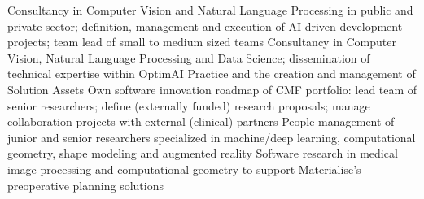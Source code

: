 \documentclass[
	a4paper,
	sidesectionsize=Large,
	maincolor=cvprimary,
	sectioncolor=cvprimary,
	sidecolor=cvprimary!10,
	topbottommargin=0.02\paperheight,
	leftrightmargin=0.02\paperwidth,
	profilepiczoom=1.6,
	profilepicxshift=-1mm,
	profilepicyshift=-7mm,
	profilepicrounding=0.5cm,
]{fortysecondscv}
\begin{document}
\makefrontsidebar
\newlength{\firstpagespacing}
\setlength{\firstpagespacing}{2ex}

\vspace{\firstpagespacing}
\vspace*{-1ex}
\begin{cvtable}[3.5]
	{Consultancy in Computer Vision and Natural Language Processing in public and private sector; definition, management and execution of AI-driven development projects; team lead of small to medium sized teams}
	{Consultancy in Computer Vision, Natural Language Processing and Data Science; dissemination of technical expertise within OptimAI Practice and the creation and management of Solution Assets}
	{Own software innovation roadmap of CMF portfolio: lead team of senior researchers; define (externally funded) research proposals; manage collaboration projects with external (clinical) partners}
	{People management of junior and senior researchers specialized in machine/deep learning, computational geometry, shape modeling and augmented reality}
	{Software research in medical image processing and computational geometry to support Materialise's preoperative planning solutions}
\end{cvtable}
\end{document}
